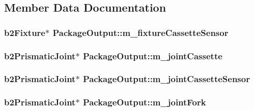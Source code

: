 \subsection{Member Data Documentation}
\hypertarget{classPackageOutput_a707dc7e298abe79485a24b7cd5fe3a26}{
\subsubsection[{m\-\_\-fixture\-Cassette\-Sensor}]{\setlength{\rightskip}{0pt plus 5cm}b2\-Fixture$\ast$ Package\-Output\-::m\-\_\-fixture\-Cassette\-Sensor}}\label{classPackageOutput_a707dc7e298abe79485a24b7cd5fe3a26}
\hypertarget{classPackageOutput_ac5b706bf7b0394579afaa66fa416bdc8}{
\subsubsection[{m\-\_\-joint\-Cassette}]{\setlength{\rightskip}{0pt plus 5cm}b2\-Prismatic\-Joint$\ast$ Package\-Output\-::m\-\_\-joint\-Cassette}}\label{classPackageOutput_ac5b706bf7b0394579afaa66fa416bdc8}
\hypertarget{classPackageOutput_ad7fd83bf723bc703b88a2cb18b3b8258}{
\subsubsection[{m\-\_\-joint\-Cassette\-Sensor}]{\setlength{\rightskip}{0pt plus 5cm}b2\-Prismatic\-Joint$\ast$ Package\-Output\-::m\-\_\-joint\-Cassette\-Sensor}}\label{classPackageOutput_ad7fd83bf723bc703b88a2cb18b3b8258}
\hypertarget{classPackageOutput_acf132fdef37105ce91af9fedab94969a}{
\subsubsection[{m\-\_\-joint\-Fork}]{\setlength{\rightskip}{0pt plus 5cm}b2\-Prismatic\-Joint$\ast$ Package\-Output\-::m\-\_\-joint\-Fork}}\label{classPackageOutput_acf132fdef37105ce91af9fedab94969a}
